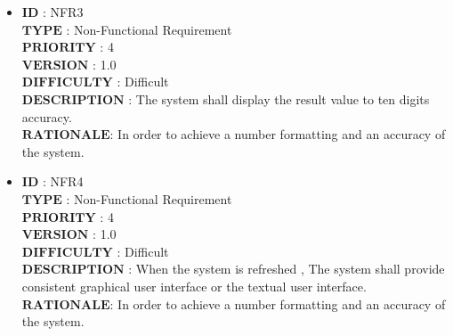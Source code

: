 \documentclass[a4paper, 11pt]{article}
\begin{document}
\begin{itemize}
    \item $\boldsymbol{ID}$\hspace{2.95cm}   : NFR3\\
    $\boldsymbol{TYPE}$\hspace{2.2cm}   : Non-Functional Requirement\\
   $\boldsymbol{PRIORITY}$\hspace{1.05cm} : 4\\
   $\boldsymbol{VERSION}$\hspace{1.25cm} : 1.0\\
   $\boldsymbol{DIFFICULTY}$\hspace{0.4cm} : Difficult \\
   $\boldsymbol{DESCRIPTION}$     :  The system shall display the result value to ten digits accuracy. \\
   $\boldsymbol{RATIONALE}$\hspace{0.8cm}: In order to achieve a number formatting and an accuracy of the system.\\
   
   \item $\boldsymbol{ID}$\hspace{2.95cm}   : NFR4\\
    $\boldsymbol{TYPE}$\hspace{2.2cm}   : Non-Functional Requirement\\
   $\boldsymbol{PRIORITY}$\hspace{1.05cm} : 4\\
   $\boldsymbol{VERSION}$\hspace{1.25cm} : 1.0\\
   $\boldsymbol{DIFFICULTY}$\hspace{0.4cm} : Difficult \\
   $\boldsymbol{DESCRIPTION}$     :  When the system is refreshed , The system shall provide consistent graphical user interface or the textual user interface. \\
   $\boldsymbol{RATIONALE}$\hspace{0.8cm}: In order to achieve a number formatting and an accuracy of the system.\\

 \end{itemize}
\end{document}
